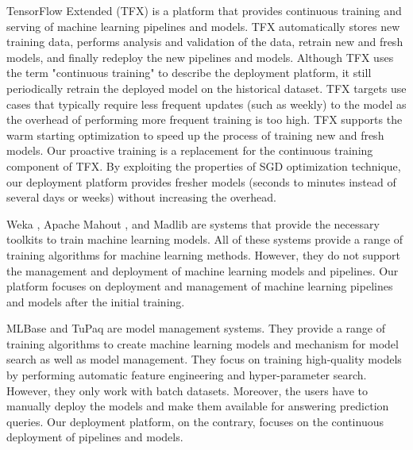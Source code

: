 TensorFlow Extended (TFX) is a platform that provides continuous training and serving of machine learning pipelines and models.
TFX automatically stores new training data, performs analysis and validation of the data, retrain new and fresh models, and finally redeploy the new pipelines and models. 
Although TFX uses the term "continuous training" to describe the deployment platform, it still periodically retrain the deployed model on the historical dataset.
TFX targets use cases that typically require less frequent updates (such as weekly) to the model as the overhead of performing more frequent training is too high.
TFX supports the warm starting optimization to speed up the process of training new and fresh models.
Our proactive training is a replacement for the continuous training component of TFX.
By exploiting the properties of SGD optimization technique, our deployment platform provides fresher models (seconds to minutes instead of several days or weeks) without increasing the overhead.

Weka \cite{hall2009weka}, Apache Mahout \cite{Owen:2011:MA:2132656}, and Madlib \cite{hellerstein2012madlib} are systems that provide the necessary toolkits to train machine learning models. 
All of these systems provide a range of training algorithms for machine learning methods. 
However, they do not support the management and deployment of machine learning models and pipelines. 
Our platform focuses on deployment and management of machine learning pipelines and models after the initial training.

MLBase \cite{kraska2013mlbase} and TuPaq \cite{sparks2015tupaq} are model management systems.
They provide a range of training algorithms to create machine learning models and mechanism for model search as well as model management.
They focus on training high-quality models by performing automatic feature engineering and hyper-parameter search.
However, they only work with batch datasets.
Moreover, the users have to manually deploy the models and make them available for answering prediction queries.
Our deployment platform, on the contrary, focuses on the continuous deployment of pipelines and models.
